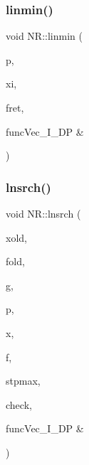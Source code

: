 \mbox{\label{namespaceNR_a4436a6bfba766ddda79e8cd4a8f1b977}} 
\subsubsection{\texorpdfstring{linmin()}{linmin()}}
{\footnotesize\ttfamily void N\+R\+::linmin (\begin{DoxyParamCaption}\item[{\mbox{\hyperlink{namespaceNR_ab293e06a6bf799d8a7ed932b6852bcb8}{Vec\+\_\+\+I\+O\+\_\+\+DP}} \&}]{p,  }\item[{\mbox{\hyperlink{namespaceNR_ab293e06a6bf799d8a7ed932b6852bcb8}{Vec\+\_\+\+I\+O\+\_\+\+DP}} \&}]{xi,  }\item[{\mbox{\hyperlink{namespaceNR_af6ff762dd605ff477b8e52387253a02a}{DP}} \&}]{fret,  }\item[{\mbox{\hyperlink{namespaceNR_af6ff762dd605ff477b8e52387253a02a}{DP}} }]{funcVec\+\_\+\+I\+\_\+\+D\+P \& }\end{DoxyParamCaption})}

\mbox{\label{namespaceNR_adc216b076b35787786f44cc443e7533f}} 
\subsubsection{\texorpdfstring{lnsrch()}{lnsrch()}}
{\footnotesize\ttfamily void N\+R\+::lnsrch (\begin{DoxyParamCaption}\item[{\mbox{\hyperlink{namespaceNR_a9f943da53862537c552e2a770cb170ae}{Vec\+\_\+\+I\+\_\+\+DP}} \&}]{xold,  }\item[{const \mbox{\hyperlink{namespaceNR_af6ff762dd605ff477b8e52387253a02a}{DP}}}]{fold,  }\item[{\mbox{\hyperlink{namespaceNR_a9f943da53862537c552e2a770cb170ae}{Vec\+\_\+\+I\+\_\+\+DP}} \&}]{g,  }\item[{\mbox{\hyperlink{namespaceNR_ab293e06a6bf799d8a7ed932b6852bcb8}{Vec\+\_\+\+I\+O\+\_\+\+DP}} \&}]{p,  }\item[{\mbox{\hyperlink{namespaceNR_a970094d23441f8ef6a45282a7eb2103d}{Vec\+\_\+\+O\+\_\+\+DP}} \&}]{x,  }\item[{\mbox{\hyperlink{namespaceNR_af6ff762dd605ff477b8e52387253a02a}{DP}} \&}]{f,  }\item[{const \mbox{\hyperlink{namespaceNR_af6ff762dd605ff477b8e52387253a02a}{DP}}}]{stpmax,  }\item[{bool \&}]{check,  }\item[{\mbox{\hyperlink{namespaceNR_af6ff762dd605ff477b8e52387253a02a}{DP}} }]{funcVec\+\_\+\+I\+\_\+\+D\+P \& }\end{DoxyParamCaption})}


